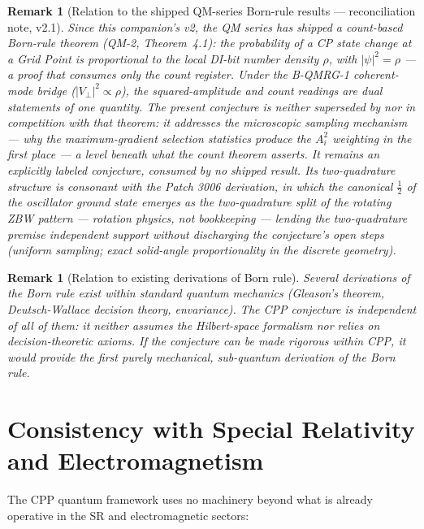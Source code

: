 \documentclass[12pt]{article}
\newtheorem{remark}[theorem]{Remark}
\begin{document}
\begin{remark}[Relation to the shipped QM-series Born-rule results — reconciliation note, v2.1]
Since this companion's v2, the QM series has shipped a count-based
Born-rule theorem (QM-2, Theorem~4.1): the probability of a CP state
change at a Grid Point is proportional to the local DI-bit number
density $\rho$, with $|\psi|^2 = \rho$ — a proof that consumes only the
count register. Under the B-QMRG-1 coherent-mode bridge
($|V_{\perp}|^2 \propto \rho$), the squared-amplitude and
count readings are dual statements of one quantity. The present
conjecture is neither superseded by nor in competition with that
theorem: it addresses the \emph{microscopic sampling mechanism} — why
the maximum-gradient selection statistics produce the $A_i^2$ weighting
in the first place — a level beneath what the count theorem asserts. It
remains an explicitly labeled conjecture, consumed by no shipped
result. Its two-quadrature structure is consonant with the Patch 3006
derivation, in which the canonical $\tfrac{1}{2}$ of the oscillator
ground state emerges as the two-quadrature split of the rotating ZBW
pattern — rotation physics, not bookkeeping — lending the two-quadrature
premise independent support without discharging the conjecture's open
steps (uniform sampling; exact solid-angle proportionality in the
discrete geometry).
\end{remark}

\begin{remark}[Relation to existing derivations of Born rule]
Several derivations of the Born rule exist within standard quantum mechanics
(Gleason's theorem, Deutsch-Wallace decision theory, envariance).  The CPP
conjecture is independent of all of them: it neither assumes the Hilbert-space
formalism nor relies on decision-theoretic axioms.  If the conjecture can be
made rigorous within CPP, it would provide the first purely mechanical,
sub-quantum derivation of the Born rule.
\end{remark}

\section{Consistency with Special Relativity and Electromagnetism}
\label{sec:consistency}

The CPP quantum framework uses no machinery beyond what is already operative
in the SR and electromagnetic sectors:
\end{document}

